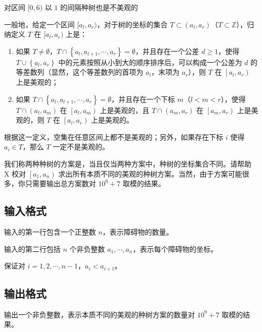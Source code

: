 对区间 $[0, 6)$ 以 $1$ 的间隔种树也是不美观的

一般地，给定一个区间 $[a_l, a_r)$，对于树的坐标的集合 $T\subset(a_l, a_r)$（$T\subset\mathbb{Z}$），归纳定义 $T$ 在 $[a_l, a_r)$ 上是{}：

\begin{enumerate}

\item 如果 $T\ne \emptyset$，$T\cap \left\{a_l, a_{l+1}, \cdots, a_r\right\}=\emptyset$，并且存在一个公差 $d\ge 1$，使得 $T\cup\left\{a_l, a_r\right\}$ 中的元素按照从小到大的顺序排序后，可以构成一个公差为 $d$ 的等差数列（显然，这个等差数列的首项为 $a_l$，末项为 $a_r$），则 $T$ 在 $\left[a_l, a_r\right)$ 上是美观的；

\item 如果 $T\cap \left\{a_l, a_{l+1}, \cdots, a_r\right\}=\emptyset$，并且存在一个下标 $m$（$l<m<r$），使得 $T\cap\left(a_l, a_m\right)$ 在 $\left[a_l, a_m\right)$ 上是美观的，且 $T\cap\left(a_m, a_r\right)$ 在 $\left[a_m, a_r\right)$ 上是美观的，则 $T$ 在 $\left[a_l, a_r\right)$ 上是美观的。

\end{enumerate}

根据这一定义，空集在任意区间上都不是美观的；另外，如果存在下标 $i$ 使得 $a_i \in T$，那么 $T$ 一定不是美观的。

我们称两种种树的方案是{}，当且仅当两种方案中，种树的坐标集合不同。请帮助 X 校对 $\left[a_1, a_n\right)$ 求出所有本质不同的美观的种树方案。当然，由于方案可能很多，你只需要输出总方案数对 $10^9+7$ 取模的结果。


\subsection*{输入格式}

输入的第一行包含一个正整数 $n$，表示障碍物的数量。

输入的第二行包括 $n$ 个非负整数 $a_1, \cdots, a_n$，表示每个障碍物的坐标。

保证对 $i=1, 2, \cdots, n-1$，$a_i < a_{i+1}$。


\subsection*{输出格式}

输出一个非负整数，表示本质不同的美观的种树方案的数量对 $10^9+7$ 取模的结果。


